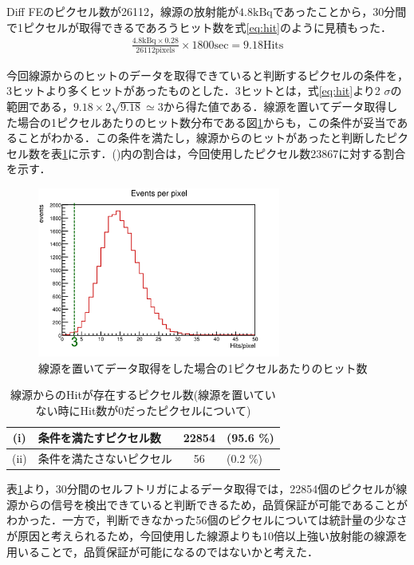 Diff FEのピクセル数が26112，線源の放射能が$4.8 \mathrm{kBq}$であったことから，30分間で1ピクセルが取得できるであろうヒット数を式\ref{eq:hit}のように見積もった．
\begin{eqnarray}
  \label{eq:hit}
  \frac{4.8 \mathrm{kBq} \times 0.28}{26112 \mathrm{pixels}} \times 1800 \mathrm{sec} = 9.18 \mathrm{Hits}
\end{eqnarray}

今回線源からのヒットのデータを取得できていると判断するピクセルの条件を，3ヒットより多くヒットがあったものとした．3ヒットとは，式\ref{eq:hit}より2 $\sigma$の範囲である，$9.18 \times 2 \sqrt{9.18} \simeq 3$から得た値である．線源を置いてデータ取得した場合の1ピクセルあたりのヒット数分布である図\ref{fig:numhitdist}からも，この条件が妥当であることがわかる．この条件を満たし，線源からのヒットがあったと判断したピクセル数を表\ref{tab:0hitdist}に示す．()内の割合は，今回使用したピクセル数23867に対する割合を示す．

\begin{figure}[h]
  \centering
  \includegraphics[width=8cm]{./figure/selfperpix.png}
  \caption{線源を置いてデータ取得をした場合の1ピクセルあたりのヒット数}
  \label{fig:numhitdist}
\end{figure}


\begin{table}[h]
  \centering
  \caption{線源からのHitが存在するピクセル数(線源を置いていない時にHit数が0だったピクセルについて)}
  \begin{tabular}{|cl|cl|} \hline
    (i) & 条件を満たすピクセル数 & 22854 & (95.6 \%) \\ \hline
    (ii) & 条件を満たさないピクセル & 56 & (0.2 \%) \\ \hline
  \end{tabular}
  \label{tab:0hitdist}
\end{table}

表\ref{tab:0hitdist}より，30分間のセルフトリガによるデータ取得では，22854個のピクセルが線源からの信号を検出できていると判断できるため，品質保証が可能であることがわかった．一方で，判断できなかった56個のピクセルについては統計量の少なさが原因と考えられるため，今回使用した線源よりも10倍以上強い放射能の線源を用いることで，品質保証が可能になるのではないかと考えた．

